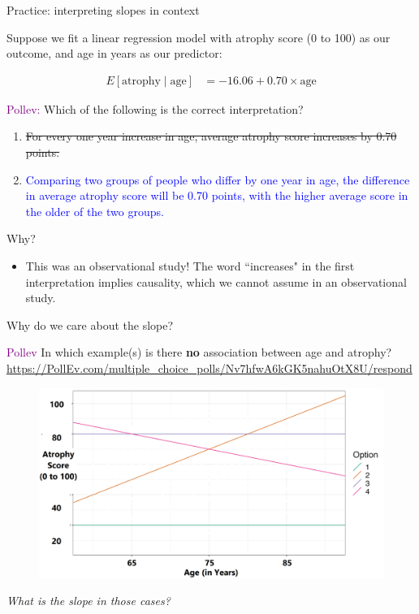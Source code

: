 \documentclass[10pt,t]{beamer}
\begin{document}
\begin{frame}{Practice: interpreting slopes in context}
	
	Suppose we fit a linear regression model with atrophy score (0 to 100) as our outcome, and age in years as our predictor:
	
	\begin{align*}
	E[\text{atrophy} \mid \text{age}] & = -16.06 + 0.70 \times \text{age}
	\end{align*}
	
	
	\textcolor{purple}{Pollev:} Which of the following is the correct interpretation?
	
	\begin{enumerate}
		\item \sout{For every one year increase in age, average atrophy score increases by 0.70 points.}
		\item \textcolor{blue}{Comparing two groups of people who differ by one year in age, the difference in average atrophy score will be 0.70 points, with the higher average score in the older of the two groups.}
	\end{enumerate}\pause

Why?
\begin{itemize}
	\item[] This was an observational study! The word ``increases" in the first interpretation implies causality, which we cannot assume in an observational study.
\end{itemize}

\end{frame}

\begin{frame}{Why do we care about the slope?}
	
	\vspace{-5 mm}
	
\textcolor{purple}{Pollev} In which example(s) is there \textbf{no} association between age and atrophy?
\url{https://PollEv.com/multiple_choice_polls/Nv7hfwA6kGK5nahuOtX8U/respond}
\vspace{0.3cm}

\begin{figure}
\centering \includegraphics[scale=0.35]{figures/zeroslopes.png}
\end{figure}\pause

\vspace{0.2cm}

\textit{What is the slope in those cases?}

\end{frame}
\end{document}
